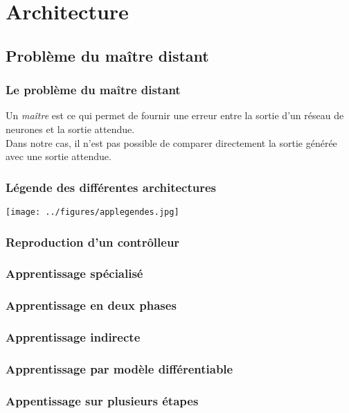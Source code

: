 \section{Architecture}
\subsection{Problème du maître distant}

\begin{frame}
 \frametitle{Le problème du maître distant}
 Un \emph{maître} est ce qui permet de fournir une erreur entre la sortie d'un réseau de neurones et la sortie attendue.\\
 \vspace{0.5cm}
 Dans notre cas, il n'est pas possible de comparer directement la sortie générée avec une sortie attendue.
\end{frame}

\begin{frame}
 \frametitle{Légende des différentes architectures}
 \begin{center}
  \texttt{[image: ../figures/applegendes.jpg]}
 \end{center}
\end{frame}

\begin{frame}
 \frametitle{Reproduction d'un contrôlleur}
 \incinslide{}
\end{frame}

\begin{frame}
 \frametitle{Apprentissage spécialisé}
 
\end{frame}

\begin{frame}
 \frametitle{Apprentissage en deux phases}
 
\end{frame}

\begin{frame}
 \frametitle{Apprentissage indirecte}
 
\end{frame}

\begin{frame}
 \frametitle{Apprentissage par modèle différentiable}
 
\end{frame}

\begin{frame}
 \frametitle{Appentissage sur plusieurs étapes} %
 
\end{frame}
